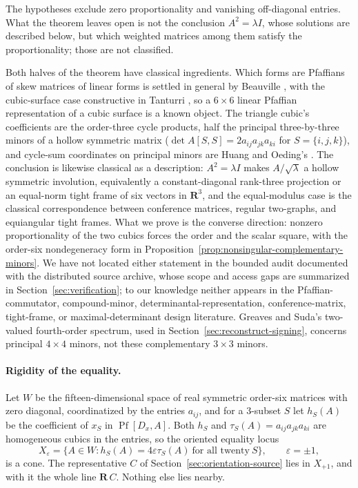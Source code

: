 The hypotheses exclude zero proportionality and vanishing off-diagonal entries.
What the theorem leaves open is not the conclusion \(A^2=\lambda I\), whose
solutions are described below, but which weighted matrices among them satisfy
the proportionality; those are not classified.

Both halves of the theorem have classical ingredients.  Which forms are
Pfaffians of skew matrices of linear forms is settled in general by Beauville
\cite{BeauvilleDeterminantal}, with the cubic-surface case constructive in
Tanturri \cite{TanturriPfaffian}, so a \(6\times6\) linear Pfaffian
representation of a cubic surface is a known object.  The triangle cubic's
coefficients are the order-three cycle products, half the principal
three-by-three minors of a hollow symmetric matrix
(\(\det A[S,S]=2a_{ij}a_{jk}a_{ki}\) for \(S=\{i,j,k\}\)), and cycle-sum
coordinates on principal minors are Huang and Oeding's \cite{HuangOeding}.
The conclusion is likewise classical as a description: \(A^2=\lambda I\)
makes \(A/\sqrt\lambda\) a hollow symmetric involution, equivalently a
constant-diagonal rank-three projection or an equal-norm tight frame of six
vectors in \(\mathbf R^3\), and the equal-modulus case is the classical
correspondence between conference matrices, regular two-graphs, and
equiangular tight frames.  What we prove is the converse direction: nonzero
proportionality of the two cubics forces the order and the scalar square,
with the order-six nondegeneracy form in
Proposition~\ref{prop:nonsingular-complementary-minors}.  We have not located
either statement in the bounded audit documented with the distributed source
archive, whose scope and access gaps are summarized in
Section~\ref{sec:verification}; to our knowledge neither appears in the
Pfaffian-commutator, compound-minor, determinantal-representation,
conference-matrix, tight-frame, or maximal-determinant design literature.
Greaves and Suda's two-valued fourth-order spectrum, used in
Section~\ref{sec:reconstruct-signing}, concerns principal \(4\times4\)
minors, not these complementary \(3\times3\) minors.

\paragraph{Rigidity of the equality.}
Let \(W\) be the fifteen-dimensional space of real symmetric order-six matrices
with zero diagonal, coordinatized by the entries \(a_{ij}\), and for a
\(3\)-subset \(S\) let \(h_S(A)\) be the coefficient of \(x_S\) in
\(\operatorname{Pf}[D_x,A]\).  Both \(h_S\) and
\(\tau_S(A)=a_{ij}a_{jk}a_{ki}\) are homogeneous cubics in the entries, so the
oriented equality locus
\[
 X_\varepsilon=\{A\in W:h_S(A)=4\varepsilon\tau_S(A)\ \text{for all twenty}\ S\},
 \qquad\varepsilon=\pm1,
\]
is a cone.  The representative \(C\) of Section~\ref{sec:orientation-source}
lies in \(X_{+1}\), and with it the whole line \(\mathbf R\,C\).  Nothing else
lies nearby.

